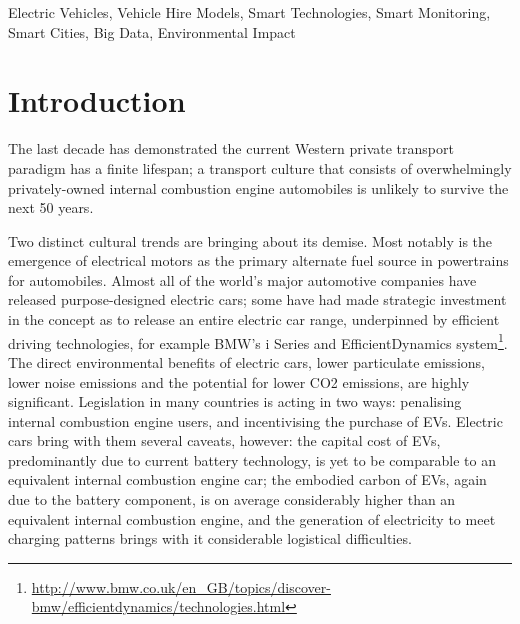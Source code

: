 \documentclass[conference]{IEEEtran}
\begin{document}
%

\begin{IEEEkeywords}
Electric Vehicles, Vehicle Hire Models, Smart Technologies, Smart
Monitoring, Smart Cities, Big Data, Environmental Impact
\end{IEEEkeywords}

\section{Introduction}

The last decade has demonstrated the current Western private transport
paradigm has a finite lifespan; a transport culture that consists of
overwhelmingly privately-owned internal combustion engine automobiles
is unlikely to survive the next 50 years.

Two distinct cultural trends are bringing about its demise. Most
notably is the emergence of electrical motors as the primary alternate
fuel source in powertrains for automobiles. Almost all of the world's
major automotive companies have released purpose-designed electric
cars; some have had made strategic investment in the concept as to
release an entire electric car range, underpinned by efficient driving
technologies, for example BMW's i Series and EfficientDynamics
system\footnote{\url{http://www.bmw.co.uk/en_GB/topics/discover-bmw/efficientdynamics/technologies.html}}.
The direct environmental benefits of electric cars, lower particulate
emissions, lower noise emissions and the potential for lower CO2
emissions, are highly significant. Legislation in many countries is
acting in two ways: penalising internal combustion engine users, and
incentivising the purchase of EVs. Electric cars bring with them
several caveats, however: the capital cost of EVs, predominantly due
to current battery technology, is yet to be comparable to an
equivalent internal combustion engine car; the embodied carbon of EVs,
again due to the battery component, is on average considerably higher
than an equivalent internal combustion engine, and the generation of
electricity to meet charging patterns brings with it considerable
logistical difficulties.
\end{document}
